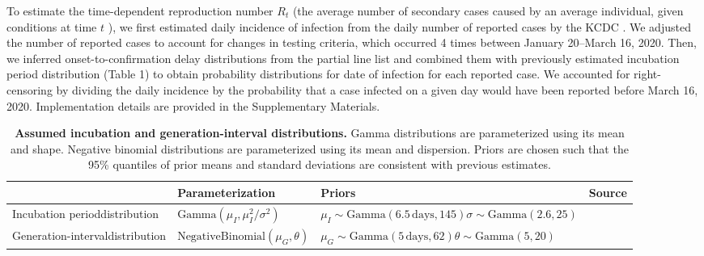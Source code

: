 \documentclass[12pt]{article}
\begin{document}
To estimate the time-dependent reproduction number $R_t$ (the average number of secondary cases caused by an average individual, given conditions at time $t$ \citep{fraser2007estimating}), we first estimated daily incidence of infection from the daily number of reported cases by the KCDC \citep{kcdc}.
We adjusted the number of reported cases to account for changes in testing criteria, which occurred 4 times between January 20--March 16, 2020.
Then, we inferred onset-to-confirmation delay distributions from the partial line list and combined them with previously estimated incubation period distribution (Table 1) to obtain probability distributions for date of infection for each reported case.
We accounted for right-censoring by dividing the daily incidence by the probability that a case infected on a given day would have been reported before March 16, 2020.
Implementation details are provided in the Supplementary Materials.

\begin{table}[t]
\begin{center}
\small
\begin{tabular}{p{4cm}|p{4.5cm}|p{4.7cm}|l}
 & Parameterization & Priors & Source \\
\hline
Incubation period\newline distribution & $\mathrm{Gamma}(\mu_I, \mu_I^2/\sigma^2)$ & $\mu_I\sim \mathrm{Gamma}(6.5\,\textrm{days}, 145)$\newline$\sigma\sim \mathrm{Gamma}(2.6, 25)$ & \citep{backer2020incubation} \\
\hline
Generation-interval\newline distribution & $\mathrm{NegativeBinomial}(\mu_G, \theta)$ & $\mu_G\sim\mathrm{Gamma}(5\,\textrm{days},62)$\newline$\theta\sim\mathrm{Gamma}(5,20)$ & \citep{ferretti2020quantifying, ganyani2020estimating} \\
\hline
\end{tabular}
\end{center}
\caption{
\textbf{Assumed incubation and generation-interval distributions.}
Gamma distributions are parameterized using its mean and shape.
Negative binomial distributions are parameterized using its mean and dispersion.
Priors are chosen such that the 95\% quantiles of prior means and standard deviations are consistent with previous estimates.
}
\end{table}
\end{document}
